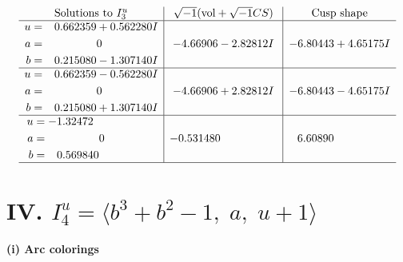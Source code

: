 \documentclass[1p]{elsarticle_modified}
\theoremstyle{definition}
\newcommand{\I}{\sqrt{-1}}
\begin{document}
$$\begin{array}{c|c|c}  
\text{Solutions to }I^u_{3}& \I (\text{vol} + \sqrt{-1}CS) & \text{Cusp shape}\\
 \hline 
\begin{aligned}
u &= \phantom{-}0.662359 + 0.562280 I \\
a &= \phantom{-0.000000 } 0 \\
b &= \phantom{-}0.215080 - 1.307140 I\end{aligned}
 & -4.66906 - 2.82812 I & -6.80443 + 4.65175 I \\ \hline\begin{aligned}
u &= \phantom{-}0.662359 - 0.562280 I \\
a &= \phantom{-0.000000 } 0 \\
b &= \phantom{-}0.215080 + 1.307140 I\end{aligned}
 & -4.66906 + 2.82812 I & -6.80443 - 4.65175 I \\ \hline\begin{aligned}
u &= -1.32472\phantom{ +0.000000I} \\
a &= \phantom{-0.000000 } 0 \\
b &= \phantom{-}0.569840\phantom{ +0.000000I}\end{aligned}
 & -0.531480\phantom{ +0.000000I} & \phantom{-}6.60890\phantom{ +0.000000I}\\
 \hline 
 \end{array}$$\newpage\newpage\renewcommand{\arraystretch}{1}
\centering \section*{IV. $I^u_{4}= \langle b^3+b^2-1,\;a,\;u+1 \rangle$}
\flushleft \textbf{(i) Arc colorings}\\
\end{document}
